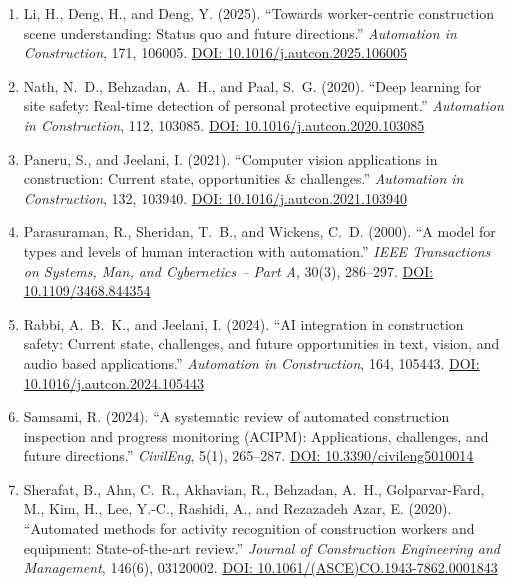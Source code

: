 \documentclass[11pt]{article}
\begin{document}
\begin{enumerate}[label=\textbf{P2-\arabic*.}]
\item Li, H., Deng, H., and Deng, Y. (2025). ``Towards worker-centric construction scene understanding: Status quo and future directions.'' \textit{Automation in Construction}, 171, 106005. \href{https://doi.org/10.1016/j.autcon.2025.106005}{DOI: 10.1016/j.autcon.2025.106005}

\item Nath, N.~D., Behzadan, A.~H., and Paal, S.~G. (2020). ``Deep learning for site safety: Real-time detection of personal protective equipment.'' \textit{Automation in Construction}, 112, 103085. \href{https://doi.org/10.1016/j.autcon.2020.103085}{DOI: 10.1016/j.autcon.2020.103085}

\item Paneru, S., and Jeelani, I. (2021). ``Computer vision applications in construction: Current state, opportunities \& challenges.'' \textit{Automation in Construction}, 132, 103940. \href{https://doi.org/10.1016/j.autcon.2021.103940}{DOI: 10.1016/j.autcon.2021.103940}

\item Parasuraman, R., Sheridan, T.~B., and Wickens, C.~D. (2000). ``A model for types and levels of human interaction with automation.'' \textit{IEEE Transactions on Systems, Man, and Cybernetics -- Part A}, 30(3), 286--297. \href{https://doi.org/10.1109/3468.844354}{DOI: 10.1109/3468.844354}

\item Rabbi, A.~B.~K., and Jeelani, I. (2024). ``AI integration in construction safety: Current state, challenges, and future opportunities in text, vision, and audio based applications.'' \textit{Automation in Construction}, 164, 105443. \href{https://doi.org/10.1016/j.autcon.2024.105443}{DOI: 10.1016/j.autcon.2024.105443}

\item Samsami, R. (2024). ``A systematic review of automated construction inspection and progress monitoring (ACIPM): Applications, challenges, and future directions.'' \textit{CivilEng}, 5(1), 265--287. \href{https://doi.org/10.3390/civileng5010014}{DOI: 10.3390/civileng5010014}

\item Sherafat, B., Ahn, C.~R., Akhavian, R., Behzadan, A.~H., Golparvar-Fard, M., Kim, H., Lee, Y.-C., Rashidi, A., and Rezazadeh Azar, E. (2020). ``Automated methods for activity recognition of construction workers and equipment: State-of-the-art review.'' \textit{Journal of Construction Engineering and Management}, 146(6), 03120002. \href{https://doi.org/10.1061/(ASCE)CO.1943-7862.0001843}{DOI: 10.1061/(ASCE)CO.1943-7862.0001843}


\end{enumerate}
\end{document}
